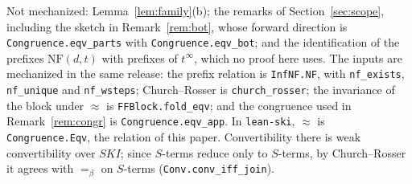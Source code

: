 \documentclass[11pt]{amsart}
\theoremstyle{definition}
\newcommand{\conv}{=_\beta}
\newcommand{\NF}{\mathrm{NF}}
\begin{document}
Not mechanized: Lemma~\ref{lem:family}(b); the remarks of Section~\ref{sec:scope}, including the
sketch in Remark~\ref{rem:bot}, whose forward direction is \texttt{Congruence.eqv\_parts} with
\texttt{Congruence.eqv\_bot}; and the identification of the prefixes $\NF(d,t)$ with prefixes of
$t^\infty$, which no proof here uses. The inputs are mechanized in the same release: the prefix
relation is \texttt{InfNF.NF}, with \texttt{nf\_exists}, \texttt{nf\_unique} and
\texttt{nf\_wsteps}; Church--Rosser is \texttt{church\_rosser}; the invariance of the block under
$\approx$ is \texttt{FFBlock.fold\_eqv}; and the congruence used in Remark~\ref{rem:congr} is
\texttt{Congruence.eqv\_app}. In \texttt{lean-ski}, $\approx$ is \texttt{Congruence.Eqv}, the
relation of this paper. Convertibility there is weak convertibility over $SKI$; since $S$-terms
reduce only to $S$-terms, by Church--Rosser it agrees with $\conv$ on $S$-terms
(\texttt{Conv.conv\_iff\_join}).



\end{document}
